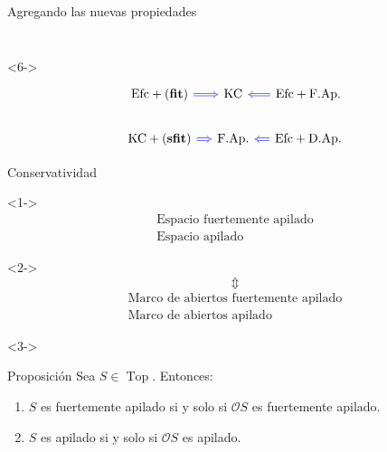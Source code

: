\documentclass[compress,12pt]{beamer}
\DeclareMathOperator{\Top}{Top}
\begin{document}
\begin{frame}{Agregando las nuevas propiedades}
\[\begin{tikzcd}[column sep=small, row sep=small]
\end{tikzcd}
\]
\begin{uncoverenv}<6->
\[
\begin{tikzcd}[column sep=small]
    {\text{Efc}+\mathbf{(fit)}} &
    {\text{KC}} &
    {\text{Efc}+\text{F.Ap.}} \\
    {\text{KC}+\mathbf{(sfit)}} &
    {\text{F.Ap.}} &
    {\text{Efc}+\text{D.Ap.}}
    \arrow[blue, Rightarrow, from=1-1, to=1-2]
    \arrow[blue, Rightarrow, from=1-3, to=1-2]
    \arrow[blue, Rightarrow, from=2-1, to=2-2]
    \arrow[blue, Rightarrow, from=2-3, to=2-2]
\end{tikzcd}
\]
\end{uncoverenv}
\end{frame}


\begin{frame}{Conservatividad}

\begin{uncoverenv}<1->
\[
\begin{gathered}
\text{Espacio fuertemente apilado}\\
\text{Espacio apilado}
\end{gathered}
\]
\end{uncoverenv}
\begin{uncoverenv}<2->
\[
\Updownarrow
\]
\[
\begin{gathered}
\text{Marco de abiertos fuertemente apilado}\\
\text{Marco de abiertos apilado}
\end{gathered}
\]
\end{uncoverenv}

\begin{uncoverenv}<3->
\begin{block}{Proposición}
Sea $S\in\Top$. Entonces:
\begin{enumerate}
    \item $S$ es fuertemente apilado si y solo si
    $\mathcal{O}S$ es fuertemente apilado.
    \item $S$ es apilado si y solo si
    $\mathcal{O}S$ es apilado.
\end{enumerate}
\end{block}
\end{uncoverenv}

\end{frame}
\end{document}
